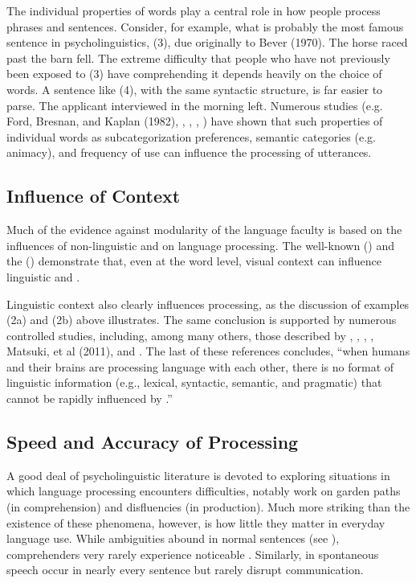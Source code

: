 \documentclass[a4paper]{article}
\begin{document}
The individual properties of words play a central role in how people process phrases and sentences.  Consider, for example, what is probably the most famous sentence in psycholinguistics, (3), due originally to Bever (1970).
\ea
The horse raced past the barn fell.
\z
The extreme difficulty that people who have not previously been exposed to (3) have comprehending it depends heavily on the choice of words.  A sentence like (4), with the same syntactic structure, is far easier to parse.
\ea
The applicant interviewed in the morning left.
\z
Numerous studies (e.g. Ford, Bresnan, and Kaplan (1982), \citet{TrueswellEtal93}, \citet{MPS94a-u}, \citet{BresnanEtal2007}, \citet{WasowEtal2011}) have shown that such properties of individual words as subcategorization preferences, semantic categories (e.g. animacy), and frequency of use can influence the processing of utterances.  

\subsection{Influence of Context}

Much of the evidence against modularity of the language faculty is based on the influences of non-linguistic  and  on language processing.  The well-known (\citet{McGurkMacDonald76}) and the  (\citet{Stroop35}) demonstrate that, even at the word level, visual context can influence linguistic  and .

Linguistic context also clearly influences processing, as the discussion of examples (2a) and (2b) above illustrates.  The same conclusion is supported by numerous controlled studies, including,
among many others, those described by \citet{CS85a}, \citet{AltmannSteedman88}, \citet{Branigan2007}, \citet{Tooley2007a}, Matsuki, et al (2011), and \citet{SpevackEtal2018}.  The last of these references concludes, ``when humans and their brains are processing language with each other, there is no format of linguistic information (e.g., lexical, syntactic, semantic, and pragmatic) that cannot be rapidly
influenced by .''

\subsection{Speed and Accuracy of Processing}

A good deal of psycholinguistic literature is devoted to exploring situations in which language processing encounters difficulties, notably work on garden paths (in comprehension) and disfluencies (in production).  Much more striking than the existence of these phenomena, however, is how little they matter in everyday language use.  While ambiguities abound in normal sentences (see \citet{Wasow2015}), comprehenders very rarely experience noticeable .  Similarly,  in spontaneous speech occur in nearly every sentence but rarely disrupt communication.  
\end{document}
